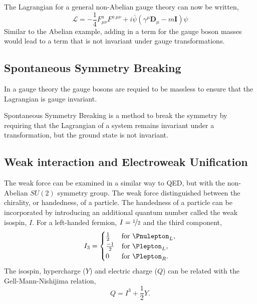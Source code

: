 The Lagrangian for a general non-Abelian gauge theory can now be written,
\begin{equation}
\mathcal{L} = 
- \frac{1}{4} F^{a}_{\mu\nu} F^{a~\mu\nu}
+ i\bar{\psi}( \gamma^{\mu} \mathbf{D}_{\mu} - m\mathbf{I} )\psi 
\end{equation}
Similar to the Abelian example, adding in a term for the gauge boson masses
would lead to a term that is not invariant under gauge transformations.

\subsection{Spontaneous Symmetry Breaking}
In a gauge theory the gauge bosons are requied to be massless to ensure that the
Lagrangian is gauge invariant.

Spontaneous Symmetry Breaking is a method to break the symmetry by requiring
that the Lagrangian of a system remains invariant under a transformation, but
the ground state is not invariant.







\subsection{Weak interaction and Electroweak Unification}
\label{sec:EWK}

The weak force can be examined in a similar way to QED, but with the non-Abelian
$SU(2)$ symmetry group. The weak force distinguished between the chirality, or
handedness, of a particle.
The handedness of a particle can be incorporated by introducing an additional
quantum number called the weak isospin, $I$.
For a left-handed fermion, $I=\nicefrac{1}{2}$ and the third component,
\begin{equation}
I_{3} =
  \begin{cases}
    \frac{1}{2}  & \text{for \Pnulepton}_L,  \\
    \frac{-1}{2} & \text{for \Plepton}_L, \\
    0            & \text{for \Plepton}_R.
  \end{cases}
\end{equation}
The isospin, hypercharge ($Y$) and electric charge ($Q$) can be related with the
Gell-Mann-Nishijima relation,
\begin{equation}
Q = I^{3} + \frac{1}{2}Y.
\end{equation}

